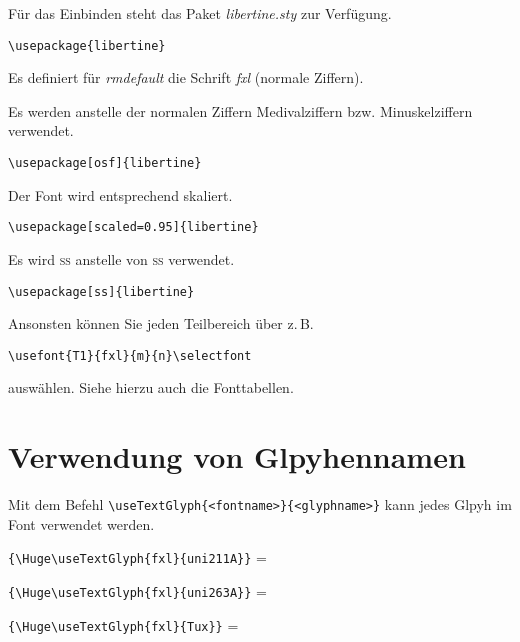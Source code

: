 \documentclass{fontdokuold}
\begin{document}
Für das Einbinden steht das Paket \textit{libertine.sty} zur Verfügung.

\begin{lstlisting}
\usepackage{libertine}
\end{lstlisting}

Es definiert für \textit{rmdefault} die Schrift \textit{fxl} (normale Ziffern).


\begin{description}
\item [osf] Es werden anstelle der normalen Ziffern Medivalziffern bzw. Minuskelziffern verwendet.
\begin{lstlisting}
\usepackage[osf]{libertine}
\end{lstlisting}

\item [scaled] Der Font wird entsprechend skaliert.
\begin{lstlisting}
\usepackage[scaled=0.95]{libertine}
\end{lstlisting}

\item [ss] Es wird \textsc{ss} anstelle von \textsc{ß} verwendet.
\begin{lstlisting}
\usepackage[ss]{libertine}
\end{lstlisting}

\end{description}

Ansonsten können Sie jeden Teilbereich über z.\,B.
\begin{lstlisting}
\usefont{T1}{fxl}{m}{n}\selectfont
\end{lstlisting}
auswählen. Siehe hierzu auch die Fonttabellen.


\section{Verwendung von Glpyhennamen}

Mit dem Befehl \verb|\useTextGlyph{<fontname>}{<glyphname>}| kann jedes Glpyh im Font
verwendet werden.


\verb|{\Huge\useTextGlyph{fxl}{uni211A}}| = {\Huge{}} \par
\verb|{\Huge\useTextGlyph{fxl}{uni263A}}| = {\Huge{}} \par
\verb|{\Huge\useTextGlyph{fxl}{Tux}}| = {\Huge{}} \par
\end{document}
